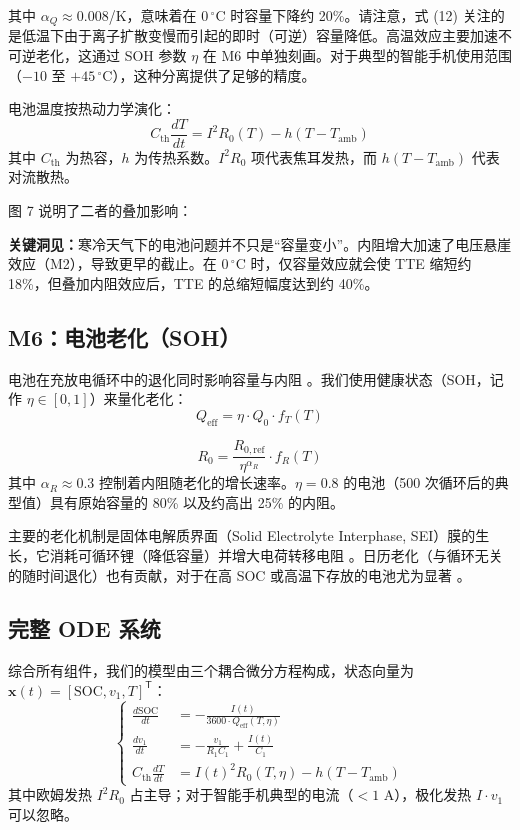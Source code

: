 \documentclass[11pt,a4paper]{ctexart}
\begin{document}
其中 $\alpha_Q \approx 0.008$/K，意味着在 $0\,^{\circ}$C 时容量下降约 20\%。请注意，式 (12) 关注的是低温下由于离子扩散变慢而引起的即时（可逆）容量降低。高温效应主要加速不可逆老化，这通过 SOH 参数 $\eta$ 在 M6 中单独刻画。对于典型的智能手机使用范围（$-10$ 至 $+45\,^{\circ}$C），这种分离提供了足够的精度。

电池温度按热动力学演化：
\begin{equation}
C_{\mathrm{th}}\frac{dT}{dt} = I^2 R_0(T) - h(T-T_{\mathrm{amb}})
\end{equation}
其中 $C_{\mathrm{th}}$ 为热容，$h$ 为传热系数。$I^2 R_0$ 项代表焦耳发热，而 $h(T-T_{\mathrm{amb}})$ 代表对流散热。

图 7 说明了二者的叠加影响：

\textbf{关键洞见：}寒冷天气下的电池问题并不只是“容量变小”。内阻增大加速了电压悬崖效应（M2），导致更早的截止。在 $0\,^{\circ}$C 时，仅容量效应就会使 TTE 缩短约 18\%，但叠加内阻效应后，TTE 的总缩短幅度达到约 40\%。

\subsection{M6：电池老化（SOH）}

电池在充放电循环中的退化同时影响容量与内阻 \cite{ref16,ref17,ref18}。我们使用健康状态（SOH，记作 $\eta\in[0,1]$）来量化老化：
\begin{equation}
Q_{\mathrm{eff}} = \eta\cdot Q_0\cdot f_T(T)
\end{equation}

\begin{equation}
R_0 = \frac{R_{0,\mathrm{ref}}}{\eta^{\alpha_R}}\cdot f_R(T)
\end{equation}
其中 $\alpha_R \approx 0.3$ 控制着内阻随老化的增长速率。$\eta = 0.8$ 的电池（500 次循环后的典型值）具有原始容量的 80\% 以及约高出 25\% 的内阻。

主要的老化机制是固体电解质界面（Solid Electrolyte Interphase, SEI）膜的生长，它消耗可循环锂（降低容量）并增大电荷转移电阻 \cite{ref18}。日历老化（与循环无关的随时间退化）也有贡献，对于在高 SOC 或高温下存放的电池尤为显著 \cite{ref16}。

\subsection{完整 ODE 系统}

综合所有组件，我们的模型由三个耦合微分方程构成，状态向量为 $\mathbf{x}(t) = [\mathrm{SOC}, v_1, T]^{\mathsf{T}}$：
\begin{equation}
\left\{
\begin{aligned}
\frac{d\mathrm{SOC}}{dt} &= -\frac{I(t)}{3600\cdot Q_{\mathrm{eff}}(T,\eta)}\\[2pt]
\frac{dv_1}{dt} &= -\frac{v_1}{R_1 C_1} + \frac{I(t)}{C_1}\\[2pt]
C_{\mathrm{th}}\frac{dT}{dt} &= I(t)^2 R_0(T,\eta) - h(T - T_{\mathrm{amb}})
\end{aligned}
\right.
\end{equation}
其中欧姆发热 $I^2 R_0$ 占主导；对于智能手机典型的电流（$<1$ A），极化发热 $I\cdot v_1$ 可以忽略。
\end{document}
